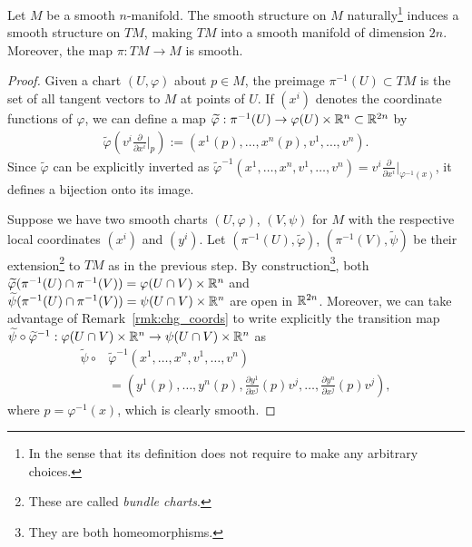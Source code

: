 \begin{theorem}\label{thm:tgbdlsmoothmfld}
	Let $M$ be a smooth $n$-manifold.
	The smooth structure on $M$ naturally\footnote{In the sense that its definition does not require to make any arbitrary choices.} induces a smooth structure on $TM$, making $TM$ into a smooth manifold of dimension $2n$.
	Moreover, the map $\pi: TM \to M$ is smooth.
\end{theorem}
\begin{proof}
	Given a chart $(U,\varphi)$ about $p\in M$, the preimage $\pi^{-1}(U) \subset TM$ is the set of all tangent vectors to $M$ at points of $U$.
	If $(x^i)$ denotes the coordinate functions of $\varphi$, we can define a map $\widetilde\varphi : \pi^{-1}(U) \to \varphi(U)\times\mathbb{R}^n \subset \mathbb{R}^{2n}$ by
	\begin{align}\label{eq:nat_coords}
		\widetilde\varphi\left(v^i \frac{\partial}{\partial x^i}\Big|_p\right) := \left(x^1(p), \ldots, x^n(p), v^1, \ldots, v^n\right).
	\end{align}
	Since $\widetilde\varphi$ can be explicitly inverted as $\widetilde\varphi^{-1}\left(x^1, \ldots, x^n, v^1, \ldots, v^n\right) = v^i \frac{\partial}{\partial x^i}\Big|_{\varphi^{-1}(x)}$, it defines a bijection onto its image.

	Suppose we have two smooth charts $(U,\varphi)$, $(V,\psi)$ for $M$ with the respective local coordinates $(x^i)$ and $(y^i)$.
	Let $(\pi^{-1}(U),\widetilde\varphi)$, $(\pi^{-1}(V),\widetilde\psi)$ be their extension\footnote{These are called \emph{bundle charts}.} to $TM$ as in the previous step.
	By construction\footnote{They are both homeomorphisms.}, both $\widetilde\varphi(\pi^{-1}(U)\cap\pi^{-1}(V)) = \varphi(U\cap V)\times\mathbb{R}^n$ and $\widetilde\psi(\pi^{-1}(U)\cap\pi^{-1}(V)) = \psi(U\cap V)\times\mathbb{R}^n$ are open in $\mathbb{R}^{2n}$.
	Moreover, we can take advantage of Remark~\ref{rmk:chg_coords} to write explicitly the transition map  $\widetilde\psi\circ\widetilde\varphi^{-1}: \varphi(U\cap V)\times\mathbb{R}^n \to \psi(U\cap V)\times\mathbb{R}^n$ as
	\begin{align}
		\widetilde\psi\circ & \widetilde\varphi^{-1}\left(x^1, \ldots, x^n, v^1, \ldots, v^n\right)                                                            \\
		                    & =\left(y^1(p),\ldots, y^n(p), \frac{\partial y^1}{\partial x^j}(p) v^j, \ldots, \frac{\partial y^n}{\partial x^j}(p) v^j\right),
	\end{align}
	where $p = \varphi^{-1}(x)$, which is clearly smooth.


\end{proof}
